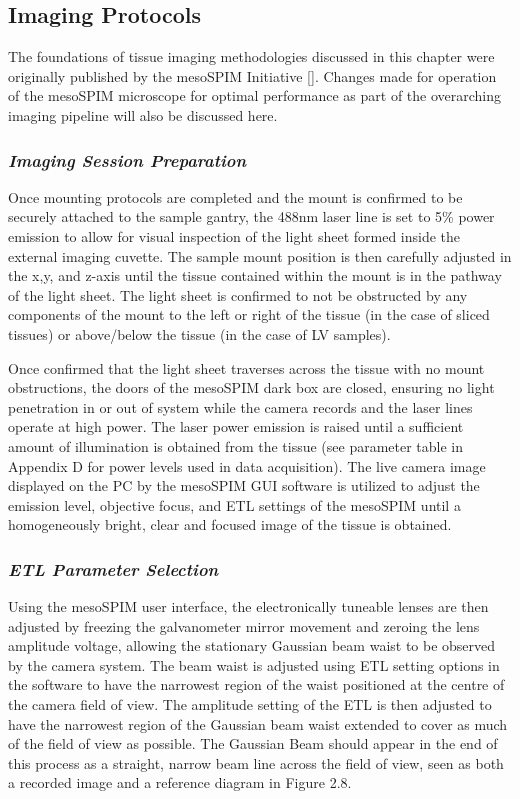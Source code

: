 \subsection{Imaging Protocols}

The foundations of tissue imaging methodologies discussed in this chapter were originally published by the mesoSPIM Initiative []. Changes made for operation of the mesoSPIM microscope for optimal performance as part of the overarching imaging pipeline will also be discussed here.

\subsubsection{\textit{Imaging Session Preparation}}
Once mounting protocols are completed and the mount is confirmed to be securely attached to the sample gantry, the 488nm laser line is set to 5\% power emission to allow for visual inspection of the light sheet formed inside the external imaging cuvette. The sample mount position is then carefully adjusted in the x,y, and z-axis until the tissue contained within the mount is in the pathway of the light sheet. The light sheet is confirmed to not be obstructed by any components of the mount to the left or right of the tissue (in the case of sliced tissues) or above/below the tissue (in the case of LV samples).

Once confirmed that the light sheet traverses across the tissue with no mount obstructions, the doors of the mesoSPIM dark box are closed, ensuring no light penetration in or out of system while the camera records and the laser lines operate at high power. The laser power emission is raised until a sufficient amount of illumination is obtained from the tissue (see parameter table in Appendix D for power levels used in data acquisition). The live camera image displayed on the PC by the mesoSPIM GUI software is  utilized to adjust the emission level, objective focus, and ETL settings of the mesoSPIM until a homogeneously bright, clear and focused image of the tissue is obtained. 

\subsubsection{\textit{ETL Parameter Selection}}
Using the mesoSPIM user interface, the electronically tuneable lenses are then adjusted by freezing the galvanometer mirror movement and zeroing the lens amplitude voltage, allowing the stationary Gaussian beam waist to be observed by the camera system. The beam waist is adjusted using ETL setting options in the software to have the narrowest region of the waist positioned at the centre of the camera field of view. The amplitude setting of the ETL is then adjusted to have the narrowest region of the Gaussian beam waist extended to cover as much of the field of view as possible. The Gaussian Beam should appear in the end of this process as a straight, narrow beam line across the field of view, seen as both a recorded image and a reference diagram in Figure 2.8.

